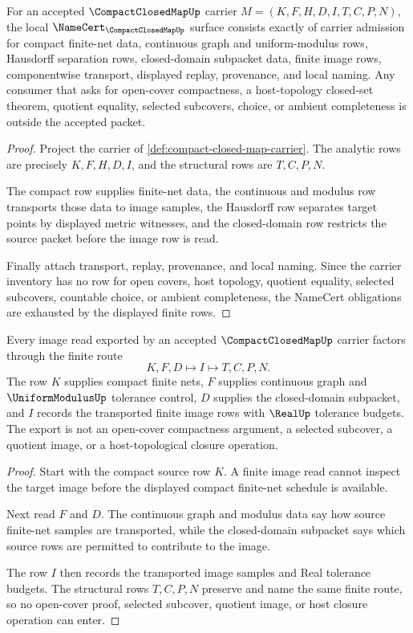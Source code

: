 \begin{theorem}
\label{thm:compact-closed-map-namecert-obligations}
For an accepted $\CompactClosedMapUp$ carrier $M=(K,F,H,D,I,T,C,P,N)$, the local $\NameCert_{\CompactClosedMapUp}$ surface consists exactly of carrier admission for compact finite-net data, continuous graph and uniform-modulus rows, Hausdorff separation rows, closed-domain subpacket data, finite image rows, componentwise transport, displayed replay, provenance, and local naming. Any consumer that asks for open-cover compactness, a host-topology closed-set theorem, quotient equality, selected subcovers, choice, or ambient completeness is outside the accepted packet.
\end{theorem}
\begin{proof}
Project the carrier of \autoref{def:compact-closed-map-carrier}. The analytic rows are precisely $K,F,H,D,I$, and the structural rows are $T,C,P,N$.

The compact row supplies finite-net data, the continuous and modulus row transports those data to image samples, the Hausdorff row separates target points by displayed metric witnesses, and the closed-domain row restricts the source packet before the image row is read.

Finally attach transport, replay, provenance, and local naming. Since the carrier inventory has no row for open covers, host topology, quotient equality, selected subcovers, countable choice, or ambient completeness, the NameCert obligations are exhausted by the displayed finite rows.
\end{proof}

\begin{theorem}
\label{thm:compact-closed-map-finite-net-image}
Every image read exported by an accepted $\CompactClosedMapUp$ carrier factors through the finite route
$$
K,F,D \longmapsto I \longmapsto T,C,P,N .
$$
The row $K$ supplies compact finite nets, $F$ supplies continuous graph and $\UniformModulusUp$ tolerance control, $D$ supplies the closed-domain subpacket, and $I$ records the transported finite image rows with $\RealUp$ tolerance budgets. The export is not an open-cover compactness argument, a selected subcover, a quotient image, or a host-topological closure operation.
\end{theorem}
\begin{proof}
Start with the compact source row $K$. A finite image read cannot inspect the target image before the displayed compact finite-net schedule is available.

Next read $F$ and $D$. The continuous graph and modulus data say how source finite-net samples are transported, while the closed-domain subpacket says which source rows are permitted to contribute to the image.

The row $I$ then records the transported image samples and Real tolerance budgets. The structural rows $T,C,P,N$ preserve and name the same finite route, so no open-cover proof, selected subcover, quotient image, or host closure operation can enter.
\end{proof}

